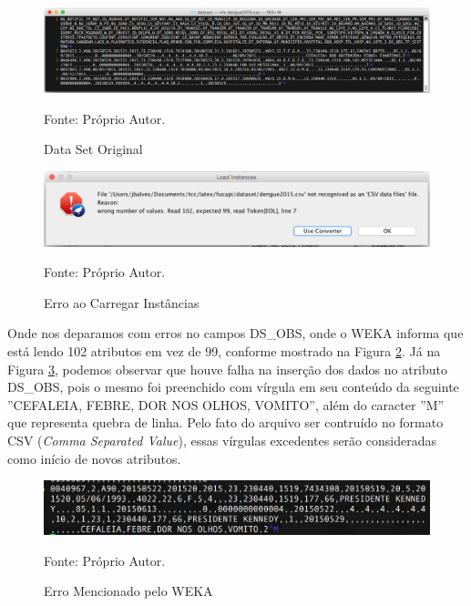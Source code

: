 \documentclass[
	12pt,				%
	openright,			%
	oneside,	
	a4paper,				%
	english,				%
	brazil				%
]{abntex2/abntex2} %
\begin{document}
		
		\begin{figure}[!htb]
			\caption{\label{figdataSetOriginal} Data Set Original}
			\begin{center}
				\includegraphics[scale=0.4]{img/dataSetOriginal.png}
			\end{center}
			{\fontsize{10}{\baselineskip} \selectfont Fonte: Próprio Autor.}
		\end{figure}
	
		\begin{figure}[!htb]
			\caption{\label{figerroCarregarInstancias} Erro ao Carregar Instâncias}
			\begin{center}
				\includegraphics[scale=0.55]{img/erroCarregarInstancias.png}
			\end{center}
			{\fontsize{10}{\baselineskip} \selectfont Fonte: Próprio Autor.}
		\end{figure}

	Onde nos deparamos com erros no campos DS\_OBS, onde o WEKA informa que está lendo 102 atributos em vez de 99, conforme mostrado na Figura \ref{figerroCarregarInstancias}. Já na Figura \ref{figerroLinhaSete}, podemos observar que houve falha na inserção dos dados no atributo DS\_OBS, pois o mesmo foi preenchido com vírgula em seu conteúdo da seguinte ''CEFALEIA, FEBRE, DOR NOS OLHOS, VOMITO'', além do caracter ''M'' que representa quebra de linha. Pelo fato do arquivo ser contruído no formato CSV (\textit{Comma Separated Value}), essas vírgulas excedentes serão consideradas como início de novos atributos.
	

	
		\begin{figure}[!htb]
			\caption{\label{figerroLinhaSete} Erro Mencionado pelo WEKA}
			\begin{center}
				\includegraphics[scale=0.45]{img/erroLinhaSete.png}
			\end{center}
			{\fontsize{10}{\baselineskip} \selectfont Fonte: Próprio Autor.}
		\end{figure}
		
\end{document}
